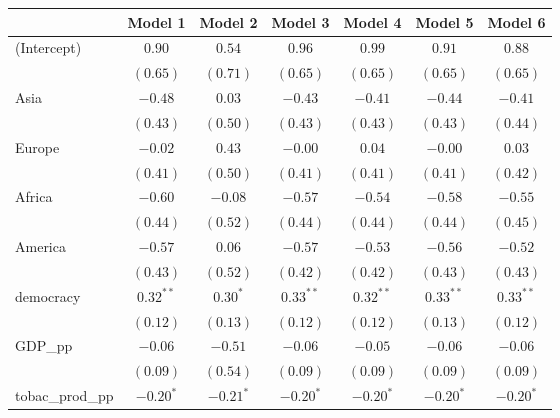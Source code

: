 
\begin{table}[!h]
\begin{center}
\begin{tabular}{l c c c c c c }
\toprule
 & Model 1 & Model 2 & Model 3 & Model 4 & Model 5 & Model 6 \\
\midrule
(Intercept)             & $0.90$       & $0.54$       & $0.96$       & $0.99$       & $0.91$       & $0.88$       \\
                        & $(0.65)$     & $(0.71)$     & $(0.65)$     & $(0.65)$     & $(0.65)$     & $(0.65)$     \\
Asia                    & $-0.48$      & $0.03$       & $-0.43$      & $-0.41$      & $-0.44$      & $-0.41$      \\
                        & $(0.43)$     & $(0.50)$     & $(0.43)$     & $(0.43)$     & $(0.43)$     & $(0.44)$     \\
Europe                  & $-0.02$      & $0.43$       & $-0.00$      & $0.04$       & $-0.00$      & $0.03$       \\
                        & $(0.41)$     & $(0.50)$     & $(0.41)$     & $(0.41)$     & $(0.41)$     & $(0.42)$     \\
Africa                  & $-0.60$      & $-0.08$      & $-0.57$      & $-0.54$      & $-0.58$      & $-0.55$      \\
                        & $(0.44)$     & $(0.52)$     & $(0.44)$     & $(0.44)$     & $(0.44)$     & $(0.45)$     \\
America                 & $-0.57$      & $0.06$       & $-0.57$      & $-0.53$      & $-0.56$      & $-0.52$      \\
                        & $(0.43)$     & $(0.52)$     & $(0.42)$     & $(0.42)$     & $(0.43)$     & $(0.43)$     \\
democracy               & $0.32^{**}$  & $0.30^{*}$   & $0.33^{**}$  & $0.32^{**}$  & $0.33^{**}$  & $0.33^{**}$  \\
                        & $(0.12)$     & $(0.13)$     & $(0.12)$     & $(0.12)$     & $(0.13)$     & $(0.12)$     \\
GDP\_pp                 & $-0.06$      & $-0.51$      & $-0.06$      & $-0.05$      & $-0.06$      & $-0.06$      \\
                        & $(0.09)$     & $(0.54)$     & $(0.09)$     & $(0.09)$     & $(0.09)$     & $(0.09)$     \\
tobac\_prod\_pp         & $-0.20^{*}$  & $-0.21^{*}$  & $-0.20^{*}$  & $-0.20^{*}$  & $-0.20^{*}$  & $-0.20^{*}$  \\

\end{tabular}
\end{center}
\end{table}
